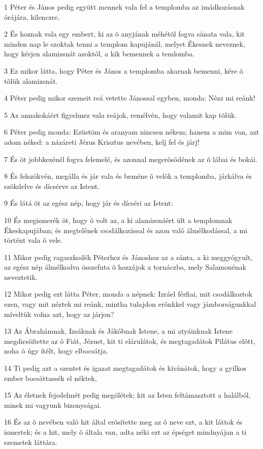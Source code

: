 \par 1 Péter és János pedig együtt mennek vala fel a templomba az imádkozásnak órájára, kilenczre.
\par 2 És hoznak vala egy embert, ki az õ anyjának méhétõl fogva sánata vala, kit minden nap le szoktak tenni a templom kapujánál, melyet Ékesnek neveznek, hogy kérjen alamizsnát azoktól, a kik bemennek a temlomba.
\par 3 Ez mikor látta, hogy Péter és János a templomba akarnak bemenni, kére õ tõlük alamizsnát.
\par 4 Péter pedig mikor szemeit reá vetette Jánossal egyben, monda: Nézz mi reánk!
\par 5 Az annakokáért figyelmez vala reájok, remélvén, hogy valamit kap tõlük.
\par 6 Péter pedig monda: Ezüstöm és aranyam nincsen nékem; hanem a mim van, azt adom néked: a názáreti Jézus Krisztus nevében, kelj fel és járj!
\par 7 És õt jobbkezénél fogva felemelé, és azonnal megerõsödének az õ lábai és bokái.
\par 8 És felszökvén, megálla és jár vala és beméne õ velök a templomba, járkálva és szökdelve és dícsérve az Istent.
\par 9 És látá õt az egész nép, hogy jár és dícséri az Istent:
\par 10 És megismerék õt, hogy õ volt az, a ki alamizsnáért ült a templomnak Ékeskapujában; és megtelének csodálkozással és azon való álmélkodással, a mi történt vala õ vele.
\par 11 Mikor pedig ragaszkodék Péterhez és Jánoshoz az a sánta, a ki meggyógyult, az egész nép álmélkodva összefuta õ hozzájok a tornáczba, mely Salamonénak neveztetik.
\par 12 Mikor pedig ezt látta Péter, monda a népnek: Izráel férfiai, mit csodálkoztok ezen, vagy mit néztek mi reánk, mintha tulajdon erõnkkel vagy jámborságunkkal míveltük volna azt, hogy az járjon?
\par 13 Az Ábrahámnak, Izsáknak és Jákóbnak Istene, a mi atyáinknak Istene megdicsõítette az õ Fiát, Jézust, kit ti elárulátok, és megtagadátok Pilátus elõtt, noha õ úgy ítélt, hogy elbocsátja.
\par 14 Ti pedig azt a szentet és igazat megtagadátok és kívánátok, hogy a gyilkos ember bocsáttassék el néktek,
\par 15 Az életnek fejedelmét pedig megölétek; kit az Isten feltámasztott a halálból, minek mi vagyunk bizonyságai.
\par 16 És az õ nevében való hit által erõsítette meg az õ neve ezt, a kit láttok és ismertek; és a hit, mely õ általa van, adta néki ezt az épséget mindnyájan a ti szemetek láttára.
